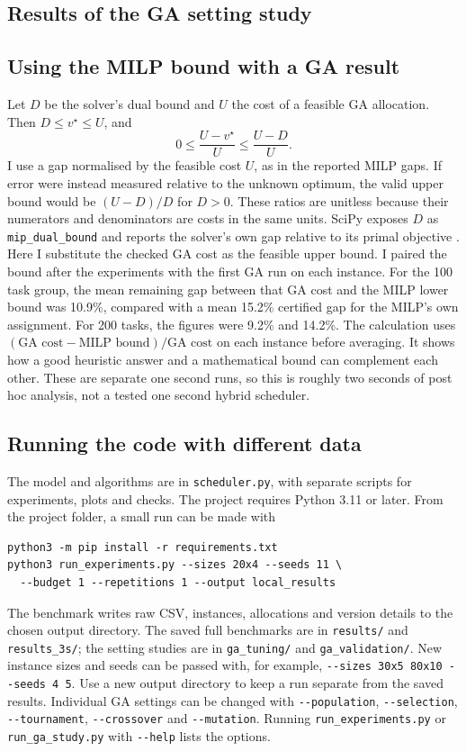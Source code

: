 \documentclass[10pt,a4paper]{article}
\begin{document}
\subsection{Results of the GA setting study}



\subsection{Using the MILP bound with a GA result}

Let $D$ be the solver's dual bound and $U$ the cost of a feasible GA allocation.
Then $D\leq v^\star\leq U$, and
\[
0\leq\frac{U-v^\star}{U}\leq\frac{U-D}{U}.
\]
I use a gap normalised by the feasible cost $U$, as in the reported MILP gaps.
If error were instead measured relative to the unknown optimum, the valid
upper bound would be $(U-D)/D$ for $D>0$. These ratios are unitless because
their numerators and denominators are costs in the same units.
SciPy exposes $D$ as \texttt{mip\_dual\_bound} and reports the solver's own
gap relative to its primal objective \cite{scipymilp}. Here I substitute the
checked GA cost as the feasible upper bound. I paired the bound after
the experiments with the first GA run on each
instance. For the 100 task group, the mean remaining gap between that GA cost
and the MILP lower bound was 10.9\%, compared with a mean 15.2\% certified gap
for the MILP's own assignment. For 200 tasks, the figures were 9.2\% and
14.2\%. The calculation uses $(\text{GA cost}-\text{MILP bound})/
\text{GA cost}$ on each instance before averaging. It shows how a good heuristic
answer and a mathematical bound can complement each other. These are separate
one second runs, so this is roughly two seconds of post hoc analysis, not a
tested one second hybrid scheduler.

\subsection{Running the code with different data}

The model and algorithms are in \texttt{scheduler.py}, with separate scripts
for experiments, plots and checks. The project requires Python 3.11 or later.
From the project folder, a small run can be made with
\begin{verbatim}
python3 -m pip install -r requirements.txt
python3 run_experiments.py --sizes 20x4 --seeds 11 \
  --budget 1 --repetitions 1 --output local_results
\end{verbatim}
The benchmark writes raw CSV, instances, allocations and version details to
the chosen output directory. The saved full benchmarks are in \texttt{results/}
and \texttt{results\_3s/}; the setting studies are in \texttt{ga\_tuning/}
and \texttt{ga\_validation/}.
New instance sizes and seeds can be passed with, for example,
\texttt{-{}-sizes 30x5 80x10 -{}-seeds 4 5}. Use a new output directory
to keep a run separate from the saved results. Individual GA settings can be
changed with \texttt{-{}-population}, \texttt{-{}-selection},
\texttt{-{}-tournament}, \texttt{-{}-crossover} and \texttt{-{}-mutation}.
Running \texttt{run\_experiments.py} or \texttt{run\_ga\_study.py} with
\texttt{-{}-help} lists the options.
\end{document}
